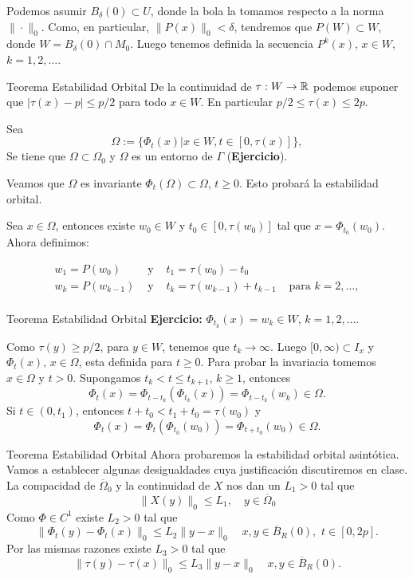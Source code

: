 Podemos asumir $B_{\delta}(0)\subset U$, donde la bola la tomamos respecto a la norma $\|\cdot\|_0$. Como, en particular, $\|P(x)\|_0<\delta$, tendremos que $P(W)\subset W$,
donde $W=B_{\delta}(0)\cap M_0$. Luego tenemos definida la secuencia $P^k(x)$, $x\in W$, $k=1,2,\ldots$. 








{Teorema Estabilidad Orbital}
De la continuidad de $\tau:W\to\mathbb{R}$ podemos suponer que $|\tau(x)-p|\leq p/2$ para todo $x\in W$. En particular $p/2\leq \tau(x)\leq 2p$. 

Sea 
\[\Omega:=\{\Phi_t(x)|x\in W, t\in [0,\tau(x)]\},\]
Se tiene que $\Omega\subset \Omega_0$ y $\Omega$ es un entorno de $\Gamma$ (\textbf{Ejercicio}). 

Veamos que $\Omega$ es invariante $\Phi_t(\Omega)\subset\Omega$, $t\geq 0$. Esto probará la estabilidad orbital. 

Sea $x\in\Omega$, entonces existe $w_0\in W$ y $t_0\in[0,\tau(w_0)]$ tal que $x=\Phi_{t_0}(w_0)$. Ahora definimos:

\[
 \begin{array}{cccc}
 w_{1}=P(w_{0})  &  \text{ y }  &    t_1=\tau(w_{0})-t_{0}     &  \\
    w_{k}=P(w_{k-1})  &  \text{ y }  &    t_k=\tau(w_{k-1})+t_{k-1}     &      \text{ para } k=2,\ldots,\\
 \end{array}
\]




{Teorema Estabilidad Orbital}
\textbf{Ejercicio:} $\Phi_{t_k}(x)=w_k\in W$, $k=1,2,\ldots$.

Como $\tau(y)\geq p/2$, para $y\in W$, tenemos que $t_k\to\infty$. Luego $[0,\infty)\subset I_x$ y $\Phi_t(x)$, $x\in\Omega$, esta definida para $t\geq 0$. Para probar la 
invariacia tomemos $x\in\Omega$ y $t>0$. Supongamos $t_k<t\leq t_{k+1}$, $k\geq 1$, entonces
\[
 \Phi_t(x)=\Phi_{t-t_k}\left(\Phi_{t_k}(x)\right)=\Phi_{t-t_k}(w_k)\in\Omega.
\]
Si $t\in (0,t_1)$, entonces $t+t_0<t_1+t_0=\tau(w_0)$ y 
\[
 \Phi_t(x)=\Phi_{t}\left(\Phi_{t_0}(w_0)\right)=\Phi_{t+t_0}(w_0)\in\Omega.
\]








{Teorema Estabilidad Orbital}
Ahora probaremos la estabilidad orbital asintótica.  Vamos a establecer algunas desigualdades cuya justificación discutiremos en clase. La compacidad de
$\overline{\Omega}_0$ y la continuidad de $X$ nos dan un $L_1>0$ tal que
\[\|X(y)\|_0\leq L_1, \quad y\in\overline{\Omega}_0\]
Como $\Phi\in C^1$ existe $L_2>0$ tal  que 
\[\|\Phi_t(y)-\Phi_t(x)\|_0\leq L_2\|y-x\|_0\quad x,y\in \overline{B}_R(0),\,\, t\in[0,2p].\]
Por las mismas razones existe $L_3>0$ tal  que 
\[\|\tau(y)-\tau(x)\|_0\leq L_3\|y-x\|_0\quad x,y\in \overline{B}_R(0).\] 



